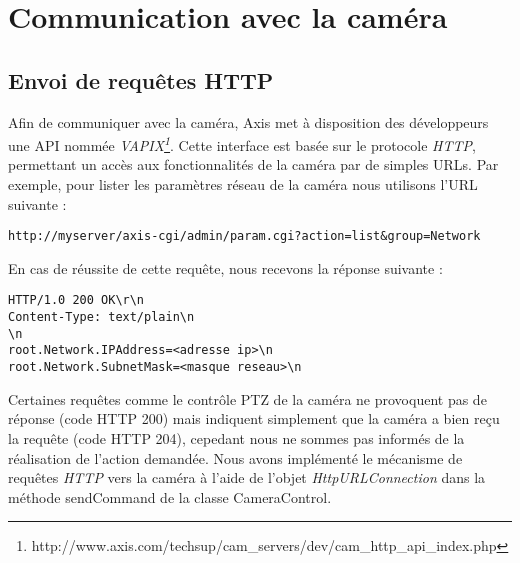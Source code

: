 \section{Communication avec la caméra}
\subsection{Envoi de requêtes HTTP}
Afin de communiquer avec la caméra, Axis met à disposition des développeurs une API nommée \textit{VAPIX\footnote{\label{vapix}
http://www.axis.com/techsup/cam_servers/dev/cam\_http\_api\_index.php}}. Cette interface est basée sur le protocole \textit{HTTP}, permettant un accès aux fonctionnalités de la caméra par de simples URLs.
Par exemple, pour lister les paramètres réseau de la caméra nous utilisons l'URL suivante :
\begin{lstlisting}
http://myserver/axis-cgi/admin/param.cgi?action=list&group=Network
\end{lstlisting}
En cas de réussite de cette requête, nous recevons la réponse suivante :
\begin{lstlisting}
HTTP/1.0 200 OK\r\n
Content-Type: text/plain\n
\n
root.Network.IPAddress=<adresse ip>\n
root.Network.SubnetMask=<masque reseau>\n
\end{lstlisting}

Certaines requêtes comme le contrôle PTZ de la caméra ne provoquent pas de réponse (code HTTP 200) mais indiquent simplement que la caméra a bien reçu la requête (code HTTP 204), cepedant nous ne sommes pas informés de la réalisation de l'action demandée.
Nous avons implémenté le mécanisme de requêtes \textit{HTTP} vers la caméra à l'aide de l'objet \textit{HttpURLConnection} dans la méthode sendCommand de la classe CameraControl.